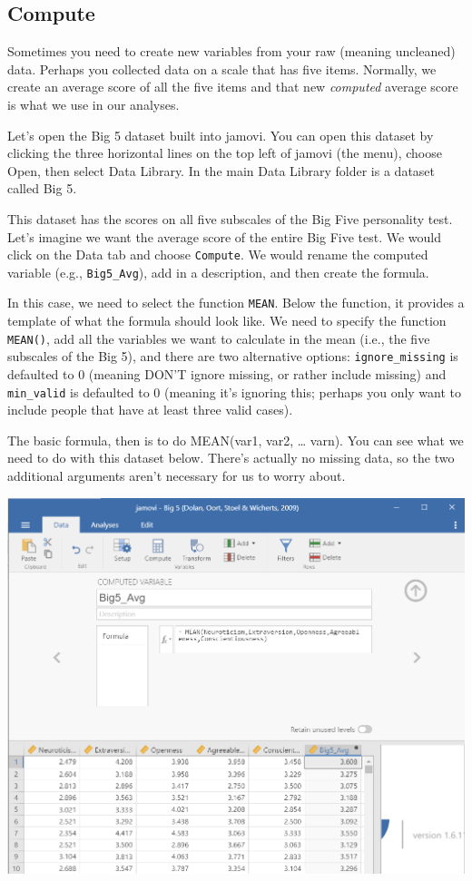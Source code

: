 \documentclass[
]{book}
\begin{document}
\hypertarget{compute}{%
\subsection{Compute}\label{compute}}

Sometimes you need to create new variables from your raw (meaning uncleaned) data. Perhaps you collected data on a scale that has five items. Normally, we create an average score of all the five items and that new \emph{computed} average score is what we use in our analyses.

Let's open the Big 5 dataset built into jamovi. You can open this dataset by clicking the three horizontal lines on the top left of jamovi (the menu), choose Open, then select Data Library. In the main Data Library folder is a dataset called Big 5.

This dataset has the scores on all five subscales of the Big Five personality test. Let's imagine we want the average score of the entire Big Five test. We would click on the Data tab and choose \texttt{Compute}. We would rename the computed variable (e.g., \texttt{Big5\_Avg}), add in a description, and then create the formula.

In this case, we need to select the function \texttt{MEAN}. Below the function, it provides a template of what the formula should look like. We need to specify the function \texttt{MEAN()}, add all the variables we want to calculate in the mean (i.e., the five subscales of the Big 5), and there are two alternative options: \texttt{ignore\_missing} is defaulted to 0 (meaning DON'T ignore missing, or rather include missing) and \texttt{min\_valid} is defaulted to 0 (meaning it's ignoring this; perhaps you only want to include people that have at least three valid cases).

The basic formula, then is to do MEAN(var1, var2, \ldots{} varn). You can see what we need to do with this dataset below. There's actually no missing data, so the two additional arguments aren't necessary for us to worry about.

\includegraphics{images/03-jamovi/compute.png}
\end{document}

